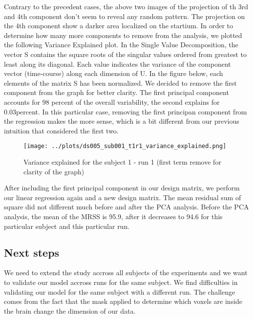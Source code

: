 \noindent
Contrary to the precedent cases, the above two images of the projection of th 3rd and
4th component don't seem to reveal any random pattern. The projection on the 4th 
component show a darker area localized on the startium.
In order to determine how many more components to remove from the analysis, we plotted 
the following Variance Explained plot.
\noindent
In the Single Value Decomposition, the vector S contains the square roots of the 
singular values ordered from greatest to least along its diagonal. Each value 
indicates the variance of the component vector (time-course) along each dimension 
of U. 
\noindent
In the figure below, each elements of the matrix S has been normalized. We decided 
to remove the first component from the graph for better clarity.
The first principal component accounts for 98 percent of the overall variability,
the second explains for 0.03percent.
In this particular case, removing the first principan component from the regression
makes the more sense, which is a bit different from our previous intuition that
considered the first two.

\begin{figure}[H]
    \centering
        \texttt{[image: ../plots/ds005\_sub001\_t1r1\_variance\_explained.png]}
     \caption{Variance explained for the subject 1 - run 1 (first term remove for clarity of the graph)}
\end{figure}

\noindent
After including the first principal component in our design matrix, we perform our
linear regression again and a new design matrix. The mean residual sum of square 
did not different much before and after the PCA analysis. Before the PCA analysis, 
the mean of the MRSS is 95.9, after it decreases to 94.6 for this particular subject 
and this particular run.

\subsection{Next steps}
\noindent
We need to extend the study accross all subjects of the experiments and we want to
validate our model accross runs for the same subject.
We find difficulties in validating our model for the same subject with a different
run. The challenge comes from the fact that the mask applied to determine which
voxels are inside the brain change the dimension of our data.


